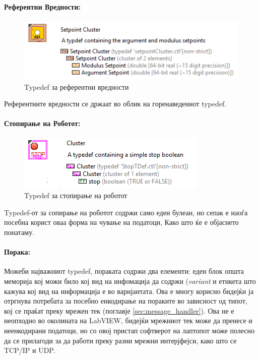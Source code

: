 \documentclass[12pt]{article}
\begin{document}
    \paragraph{Референтни Вредности:\\}
	\begin{figure}[H]
	    \includegraphics[width=0.55\linewidth]{./images/typedef_setpoints_border.PNG}
		\caption{Typedef за референтни вредности}
	    \label{fig:setpoints_typedef}
	    \raggedright
	    \end{figure}
	Референтните вредности се држаат во облик на горенаведениот typedef.

    \paragraph{Стопирање на Роботот:\\}
	\begin{figure}[H]
	    \includegraphics[width=0.55\linewidth]{./images/typedef_stop_border.PNG}
		\caption{Typedef за стопирање на роботот}
	    \label{fig:setpoints_typedef}
	    \raggedright
	    \end{figure}
        Typedef-от за сопирање на роботот содржи само еден булеан, но сепак е наоѓа посебна корист оваа форма на чување на податоци, Како што ќе е објаснето понатаму.

   \paragraph{Порака:\\}
      Можеби најважниот typedef, пораката содржи два елементи: еден блок општа меморија кој можи било кој вид на инфомација да содржи (\textit{variant} и етикета што кажува кој вид на информација е во варијантата. Ова е многу корисно бидејќи ја отргнува потребата за посебно енкодирање на пораките во зависност од типот, кој се праќат преку мрежен тек (поглавје \ref{sec:message_handler}). Ова не е неопходно во околината на LabVIEW, бидејќи мрежниот тек може да пренесе и неенкодирани податоци, но со овој пристап софтверот на лаптопот може полесно да се прилагоди за да работи преку разни мрежни интерјфејси, како што се TCP/IP и UDP. 
   
\end{document}
